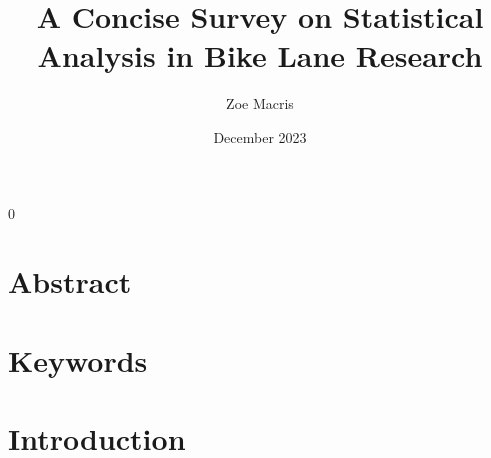 \documentclass[12pt, letterpaper]{article}
\newcommand{\blind}{0}
\begin{document}

\blind
{
  \title{\bf A Concise Survey on Statistical Analysis in Bike Lane Research}
  \author{Zoe Macris}
\date{December 2023}
  \maketitle} 


\section{Abstract}
\label{sec:abstract}



\section{Keywords}
\label{sec:keywords}


\section{Introduction}
\label{sec:intro}
\end{document}
